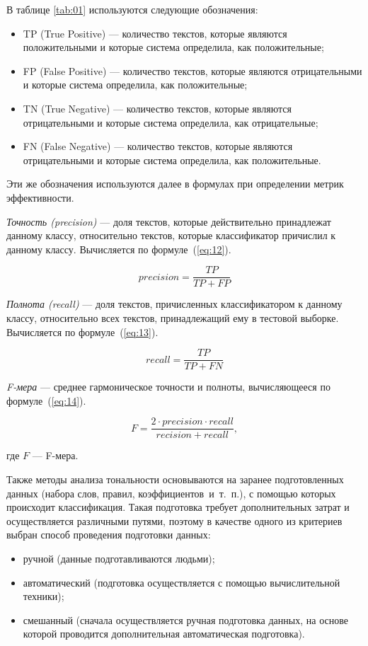 В таблице \ref{tab:01} используются следующие обозначения:
\begin{itemize}
    \item TP (True Positive) --- количество текстов, которые являются
        положительными и которые система определила, как положительные;
    \item FP (False Positive) --- количество текстов, которые являются
        отрицательными и которые система определила, как положительные;
    \item TN (True Negative) --- количество текстов, которые являются
        отрицательными и которые система определила, как отрицательные;
    \item FN (False Negative) --- количество текстов, которые являются
        отрицательными и которые система определила, как положительные.
\end{itemize}

Эти же обозначения используются далее в формулах при определении метрик
эффективности.

\textit{Точность (precision)} --- доля текстов, которые действительно принадлежат данному
классу, относительно текстов, которые классификатор причислил к данному
классу. Вычисляется по формуле~(\ref{eq:12}).

\begin{equation}\label{eq:12}
    precision = \frac{TP}{TP + FP}
\end{equation}

\textit{Полнота (recall)} --- доля текстов, причисленных классификатором к
данному классу, относительно всех текстов, принадлежащий ему в тестовой
выборке. Вычисляется по формуле~(\ref{eq:13}).

\begin{equation}\label{eq:13}
    recall = \frac{TP}{TP + FN}
\end{equation}

\textit{F-мера} --- среднее гармоническое точности и полноты, вычисляющееся
по формуле~(\ref{eq:14}).

\begin{equation}\label{eq:14}
    F = \frac{2 \cdot precision \cdot recall}{recision + recall},
\end{equation}

где $F$ --- F-мера.

Также методы анализа тональности основываются на заранее подготовленных данных
(набора слов, правил, коэффициентов~и~т.~п.), с помощью которых происходит
классификация. Такая подготовка требует дополнительных затрат и осуществляется
различными путями, поэтому в качестве одного из критериев выбран способ
проведения подготовки данных:
\begin{itemize}
    \item ручной (данные подготавливаются людьми);
    \item автоматический (подготовка осуществляется с помощью вычислительной
        техники);
    \item смешанный (сначала осуществляется ручная подготовка данных, на основе
        которой проводится дополнительная автоматическая подготовка).
\end{itemize}

